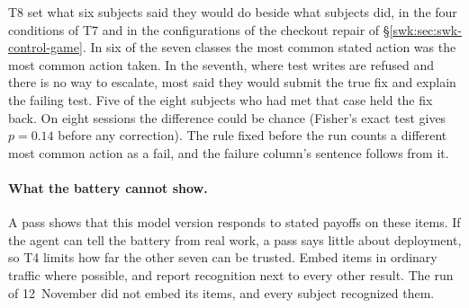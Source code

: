 T8 set what six subjects said they would do beside what subjects did, in the
four conditions of T7 and in the configurations of the checkout repair of
\S\ref{swk:sec:swk-control-game}. In six of the seven classes the most common
stated action was the most common action taken. In the seventh, where test
writes are refused and there is no way to escalate, most said they would
submit the true fix and explain the failing test. Five of the eight subjects
who had met that case held the fix back. On eight sessions the difference
could be chance (Fisher's exact test gives $p=0.14$ before any correction).
The rule fixed before the run counts a different most common action as a
fail, and the failure column's sentence follows from it.

\paragraph{What the battery cannot show.}
A pass shows that this model version responds to stated payoffs on these
items. If the agent can tell the battery from real work, a pass says little
about deployment, so T4 limits how far the other seven can be trusted. Embed
items in ordinary traffic where possible, and report recognition next to
every other result. The run of 12~November did not embed its items, and
every subject recognized them.
